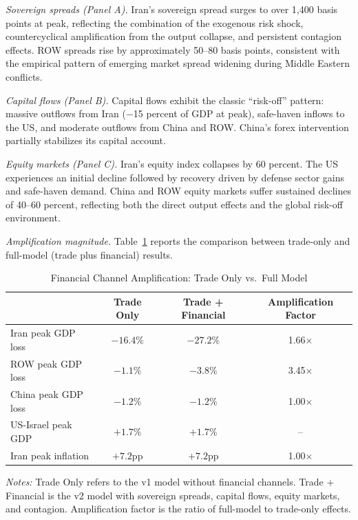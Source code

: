 \documentclass[12pt,a4paper]{article}
\begin{document}
\textit{Sovereign spreads (Panel A).} Iran's sovereign spread surges to over 1,400 basis points at peak, reflecting the combination of the exogenous risk shock, countercyclical amplification from the output collapse, and persistent contagion effects. ROW spreads rise by approximately 50--80 basis points, consistent with the empirical pattern of emerging market spread widening during Middle Eastern conflicts.

\textit{Capital flows (Panel B).} Capital flows exhibit the classic ``risk-off'' pattern: massive outflows from Iran ($-$15 percent of GDP at peak), safe-haven inflows to the US, and moderate outflows from China and ROW. China's forex intervention partially stabilizes its capital account.

\textit{Equity markets (Panel C).} Iran's equity index collapses by 60 percent. The US experiences an initial decline followed by recovery driven by defense sector gains and safe-haven demand. China and ROW equity markets suffer sustained declines of 40--60 percent, reflecting both the direct output effects and the global risk-off environment.

\textit{Amplification magnitude.} Table~\ref{tab:amplification} reports the comparison between trade-only and full-model (trade plus financial) results.

\begin{table}[H]
\centering
\small
\begin{threeparttable}
\caption{Financial Channel Amplification: Trade Only vs.\ Full Model}
\label{tab:amplification}
\begin{tabular}{@{}lccc@{}}
\toprule
& Trade Only & Trade + Financial & Amplification Factor \\
\midrule
Iran peak GDP loss & $-16.4\%$ & $-27.2\%$ & 1.66$\times$ \\
ROW peak GDP loss & $-1.1\%$ & $-3.8\%$ & 3.45$\times$ \\
China peak GDP loss & $-1.2\%$ & $-1.2\%$ & 1.00$\times$ \\
US-Israel peak GDP & $+1.7\%$ & $+1.7\%$ & -- \\
Iran peak inflation & $+7.2$pp & $+7.2$pp & 1.00$\times$ \\
\bottomrule
\end{tabular}
\begin{tablenotes}[flushleft]
\small
\item \textit{Notes:} Trade Only refers to the v1 model without financial channels. Trade + Financial is the v2 model with sovereign spreads, capital flows, equity markets, and contagion. Amplification factor is the ratio of full-model to trade-only effects.
\end{tablenotes}
\end{threeparttable}
\end{table}
\end{document}
